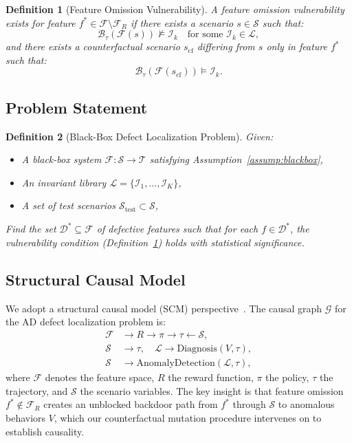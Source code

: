 \documentclass[journal]{IEEEtran}
\theoremstyle{plain}
\newtheorem{definition}{Definition}[section]
\theoremstyle{definition}
\theoremstyle{remark}
\newcommand{\invlib}{\mathcal{L}}
\newcommand{\scenario}{\mathcal{S}}
\newcommand{\traj}{\mathcal{T}}
\newcommand{\sys}{\mathcal{F}}
\newcommand{\beh}{\mathcal{B}}
\newcommand{\feat}{\mathcal{F}}
\begin{document}
\begin{definition}[Feature Omission Vulnerability]\label{def:omission}
A feature omission vulnerability exists for feature $f^* \in \feat \setminus \feat_R$ if there exists a scenario $s \in \scenario$ such that:
\begin{equation}
\beh_{\tau}(\sys(s)) \not\models \mathcal{I}_k \quad\text{for some }\mathcal{I}_k\in\invlib,
\label{eq:vulnerability}
\end{equation}
and there exists a counterfactual scenario $s_{\text{cf}}$ differing from $s$ only in feature $f^*$ such that:
\begin{equation}
\beh_{\tau}(\sys(s_{\text{cf}})) \models \mathcal{I}_k.
\label{eq:cf_restore}
\end{equation}
\end{definition}

\subsection{Problem Statement}

\begin{definition}[Black-Box Defect Localization Problem]\label{def:problem}
Given:
\begin{itemize}[nosep]
    \item A black-box system $\sys: \scenario \to \traj$ satisfying Assumption~\ref{assump:blackbox},
    \item An invariant library $\invlib = \{\mathcal{I}_1,\dots,\mathcal{I}_K\}$,
    \item A set of test scenarios $\mathcal{S}_{\text{test}} \subset \scenario$,
\end{itemize}
Find the set $\mathcal{D}^* \subseteq \feat$ of defective features such that for each $f \in \mathcal{D}^*$, the vulnerability condition (Definition~\ref{def:omission}) holds with statistical significance.
\end{definition}

\subsection{Structural Causal Model}

We adopt a structural causal model (SCM) perspective~\cite{pearl2019probabilistic}. The causal graph $\mathcal{G}$ for the AD defect localization problem is:
\begin{equation}
\begin{aligned}
\feat &\to R \to \pi \to \tau \leftarrow \scenario, \\
\scenario &\to \tau, \quad \invlib \to \text{Diagnosis}(V, \tau), \\
\scenario &\to \text{AnomalyDetection}(\invlib, \tau),
\end{aligned}
\label{eq:causal_graph}
\end{equation}
where $\feat$ denotes the feature space, $R$ the reward function, $\pi$ the policy, $\tau$ the trajectory, and $\scenario$ the scenario variables. The key insight is that feature omission $f^* \notin \feat_R$ creates an unblocked backdoor path from $f^*$ through $\scenario$ to anomalous behaviors $V$, which our counterfactual mutation procedure intervenes on to establish causality.
\end{document}
